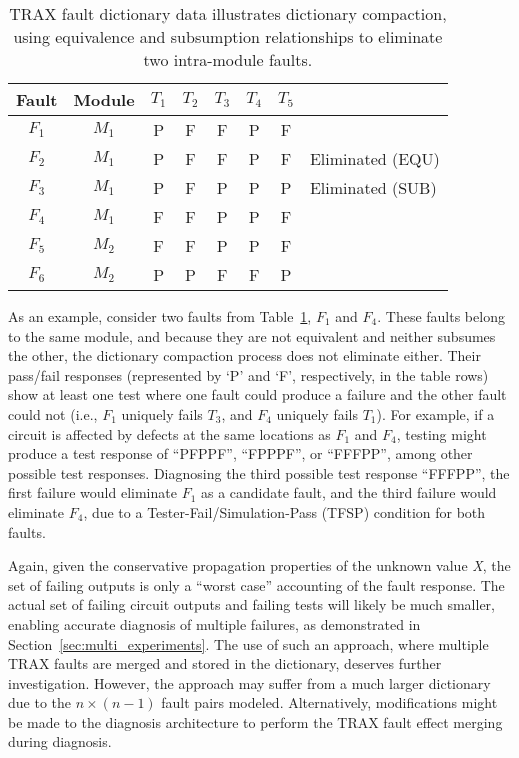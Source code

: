 \begin{table}[hbtp]
\centering
\begin{tabular*}{0.9\columnwidth}{@{\extracolsep{\fill}}cccccccl}
\toprule
Fault&Module&$T_1$&$T_2$&$T_3$&$T_4$&$T_5$&\\
\midrule
$F_1$&$M_1$&P&F&F&P&F&\\
$F_2$&$M_1$&P&F&F&P&F&Eliminated (EQU)\\
$F_3$&$M_1$&P&F&P&P&P&Eliminated (SUB)\\
$F_4$&$M_1$&F&F&P&P&F&\\
\midrule
$F_5$&$M_2$&F&F&P&P&F&\\
$F_6$&$M_2$&P&P&F&F&P&\\
\bottomrule
\end{tabular*}
\caption{TRAX fault dictionary data illustrates dictionary compaction, using equivalence and subsumption relationships to eliminate two intra-module faults.}
\label{table:multi_fault_resp}
\end{table}

As an example, consider two faults from Table~\ref{table:multi_fault_resp}, $F_1$ and $F_4$.
%
These faults belong to the same module, and because they are not equivalent and neither subsumes the other, the dictionary compaction process does not eliminate either.
%
Their pass/fail responses (represented by `P' and `F', respectively, in the table rows) show at least one test where one fault could produce a failure and the other fault could not (i.e., $F_1$ uniquely fails $T_3$, and $F_4$ uniquely fails $T_1$).
%
For example, if a circuit is affected by defects at the same locations as $F_1$ and $F_4$, testing might produce a test response of ``PFPPF'', ``FPPPF'', or ``FFFPP'', among other possible test responses.
%
Diagnosing the third possible test response ``FFFPP'', the first failure would eliminate $F_1$ as a candidate fault, and the third failure would eliminate $F_4$, due to a Tester-Fail/Simulation-Pass (TFSP) condition for both faults.

Again, given the conservative propagation properties of the unknown value \textit{X}, the set of failing outputs is only a ``worst case'' accounting of the fault response.
%
The actual set of failing circuit outputs and failing tests will likely be much smaller, enabling accurate diagnosis of multiple failures, as demonstrated in Section~\ref{sec:multi_experiments}.
%
The use of such an approach, where multiple TRAX faults are merged and stored in the dictionary, deserves further investigation.
%
However, the approach may suffer from a much larger dictionary due to the $n \times (n - 1)$ fault pairs modeled.
%
Alternatively, modifications might be made to the diagnosis architecture to perform the TRAX fault effect merging during diagnosis.


